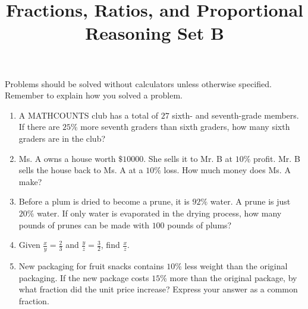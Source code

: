 \documentclass{article}
\title{Fractions, Ratios, and Proportional Reasoning Set B}
\author{}
\date{}
\begin{document}
    \maketitle
    \noindent Problems should be solved without calculators unless otherwise specified. Remember to explain how you solved a problem.
    \begin{enumerate}
        \item A MATHCOUNTS club has a total of $27$ sixth- and seventh-grade members. If there are $25\%$ more seventh graders than sixth graders, how many sixth graders are in the club?
        \vspace{3cm}
        \item Ms. A owns a house worth $\$10000$. She sells it to Mr. B at $10\%$ profit. Mr. B sells the house back to Ms. A at a $10\%$ loss. How much money does Ms. A make?
        \vspace{3cm}
        \item Before a plum is dried to become a prune, it is $92\%$ water. A prune is just $20\%$ water. If only water is evaporated in the drying process, how many pounds of prunes can be made with $100$ pounds of plums?
        \vspace{3cm}
        \item Given $\frac{x}{y} = \frac{2}{3}$ and $\frac{y}{z} = \frac{3}{2}$, find $\frac{x}{z}$.
        \vspace{3cm}
        \item New packaging for fruit snacks contains $10\%$ less weight than the original packaging. If the new package costs $15\%$ more than the original package, by what fraction did the unit price increase? Express your answer as a common fraction.
        \vspace{3cm}
    \end{enumerate}
\end{document}
